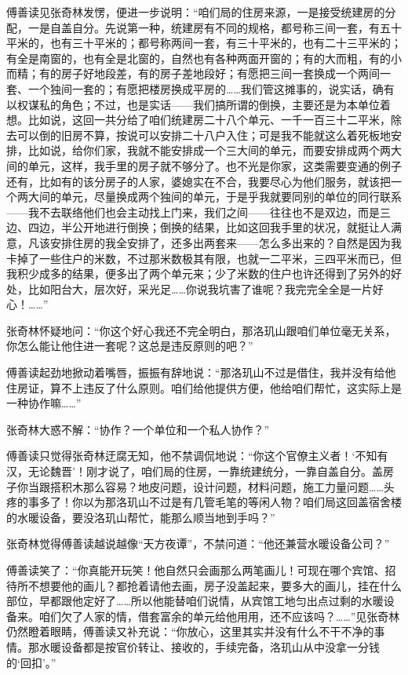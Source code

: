 \par 傅善读见张奇林发愣，便进一步说明：“咱们局的住房来源，一是接受统建房的分配，一是自盖自分。先说第一种，统建房有不同的规格，都号称三间一套，有五十平米的，也有三十平米的；都号称两间一套，有三十平米的，也有二十三平米的；有全是南窗的，也有全是北窗的，自然也有各种两面开窗的；有的大而粗，有的小而精；有的房子好地段差，有的房子差地段好；有愿把三间一套换成一个两间一套、一个独间一套的；有愿把楼房换成平房的……我们管这摊事的，说实话，确有以权谋私的角色；不过，也是实话——我们搞所谓的倒换，主要还是为本单位着想。比如说，这回一共分给了咱们统建房二十八个单元、一千一百三十二平米，除去可以倒的旧房不算，按说可以安排二十八户入住；可是我不能就这么着死板地安排，比如说，给你们家，我就不能安排成一个三大间的单元，而要安排成两个两大间的单元，这样，我手里的房子就不够分了。也不光是你家，这类需要变通的例子还有，比如有的该分房子的人家，婆媳实在不合，我要尽心为他们服务，就该把一个两大间的单元，尽量换成两个独间的单元，于是乎我就要同别的单位的同行联系——我不去联络他们也会主动找上门来，我们之间——往往也不是双边，而是三边、四边，半公开地进行倒换；倒换的结果，比如这回我手里的状况，就挺让人满意，凡该安排住房的我全安排了，还多出两套来——怎么多出来的？自然是因为我卡掉了一些住户的米数，不过那米数极其有限，也就一二平米，三四平米而已，但我积少成多的结果，便多出了两个单元来；少了米数的住户也许还得到了另外的好处，比如阳台大，层次好，采光足……你说我坑害了谁呢？我完完全全是一片好心！……”
\par 张奇林怀疑地问：“你这个好心我还不完全明白，那洛玑山跟咱们单位毫无关系，你怎么能让他住进一套呢？这总是违反原则的吧？”
\par 傅善读起劲地掀动着嘴唇，振振有辞地说：“那洛玑山不过是借住，我并没有给他住房证，算不上违反了什么原则。咱们给他提供方便，他给咱们帮忙，这实际上是一种协作嘛……”
\par 张奇林大惑不解：“协作？一个单位和一个私人协作？”
\par 傅善读只觉得张奇林迂腐无知，他不禁调侃地说：“你这个官僚主义者！‘不知有汉，无论魏晋’！刚才说了，咱们局的住房，一靠统建统分，一靠自盖自分。盖房子你当跟搭积木那么容易？地皮问题，设计问题，材料问题，施工力量问题……头疼的事多了！你以为那洛玑山不过是有几管毛笔的等闲人物？咱们局这回盖宿舍楼的水暖设备，要没洛玑山帮忙，能那么顺当地到手吗？”
\par 张奇林觉得傅善读越说越像“天方夜谭”，不禁问道：“他还兼营水暖设备公司？”
\par 傅善读笑了：“你真能开玩笑！他自然只会画那么两笔画儿！可现在哪个宾馆、招待所不想要他的画儿？都抢着请他去画，房子没盖起来，要多大的画儿，挂在什么部位，早都跟他定好了……所以他能替咱们说情，从宾馆工地匀出点过剩的水暖设备来。咱们欠了人家的情，借套富余的单元给他用用，还不应该吗？……”见张奇林仍然瞪着眼睛，傅善读又补充说：“你放心，这里其实并没有什么不干不净的事情。那水暖设备都是按官价转让、接收的，手续完备，洛玑山从中没拿一分钱的‘回扣’。”
